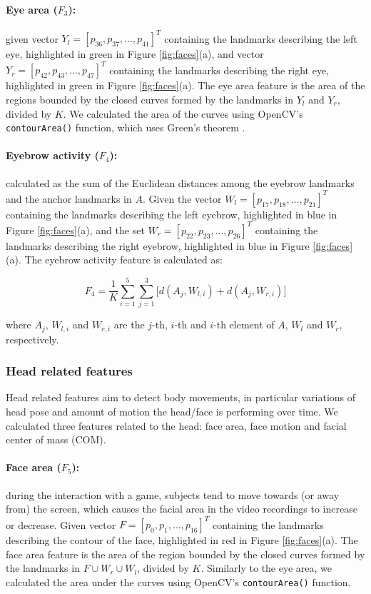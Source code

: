 \paragraph{Eye area ($F_3$):} given vector $Y_l = [p_{36}, p_{37}, \dots, p_{41}]^T$ containing the landmarks describing the left eye, highlighted in green in Figure \ref{fig:faces}(a), and vector $Y_r = [p_{42}, p_{43}, \dots, p_{47}]^T$ containing the landmarks describing the right eye, highlighted in green in Figure \ref{fig:faces}(a). The eye area feature is the area of the regions bounded by the closed curves formed by the landmarks in $Y_l$ and $Y_r$, divided by $K$. We calculated the area of the curves using OpenCV's \texttt{contourArea()} function, which uses Green's theorem \cite{stewart2011calculus}.

\paragraph{Eyebrow activity ($F_4$):} calculated as the sum of the Euclidean distances among the eyebrow landmarks and the anchor landmarks in $A$. Given the vector $W_l = [p_{17}, p_{18}, \dots, p_{21}]^T$ containing the landmarks describing the left eyebrow, highlighted in blue in Figure \ref{fig:faces}(a), and the set $W_r = [p_{22}, p_{23}, \dots, p_{26}]^T$ containing the landmarks describing the right eyebrow, highlighted in blue in Figure \ref{fig:faces}(a). The eyebrow activity feature is calculated as:

\[
F_4 = \frac{1}{K} \sum_{i=1}^{5} \sum_{j=1}^{3} \Big[ d(A_j, W_{l,i}) + d(A_j, W_{r,i}) \Big]
\]

where $A_j$, $W_{l,i}$ and $W_{r,i}$ are the $j$-th, $i$-th and $i$-th element of $A$, $W_l$ and $W_r$, respectively.

\subsubsection{Head related features}

Head related features aim to detect body movements, in particular variations of head pose and amount of motion the head/face is performing over time. We calculated three features related to the head: face area, face motion and facial center of mass (COM).

\paragraph{Face area ($F_5$):} during the interaction with a game, subjects tend to move towards (or away from) the screen, which causes the facial area in the video recordings to increase or decrease. Given vector $F = [p_{0}, p_{1}, \dots, p_{16}]^T$ containing the landmarks describing the contour of the face, highlighted in red in Figure \ref{fig:faces}(a). The face area feature is the area of the region bounded by the closed curves formed by the landmarks in $F \cup W_r \cup W_l$, divided by $K$. Similarly to the eye area, we calculated the area under the curves using OpenCV's \texttt{contourArea()} function.

